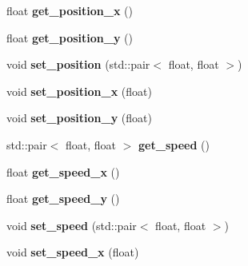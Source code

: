 \begin{DoxyCompactItemize}
\item 
float {\bfseries get\+\_\+position\+\_\+x} ()\hypertarget{classengine_1_1_game_object_a8897eb01abcb75b803977bd112586ca5}{}\label{classengine_1_1_game_object_a8897eb01abcb75b803977bd112586ca5}

\item 
float {\bfseries get\+\_\+position\+\_\+y} ()\hypertarget{classengine_1_1_game_object_aebb20a31340dd04aae07079ddb63528d}{}\label{classengine_1_1_game_object_aebb20a31340dd04aae07079ddb63528d}

\item 
void {\bfseries set\+\_\+position} (std\+::pair$<$ float, float $>$)\hypertarget{classengine_1_1_game_object_ada8fe8ebffd004fc9c37d3ea19b449ba}{}\label{classengine_1_1_game_object_ada8fe8ebffd004fc9c37d3ea19b449ba}

\item 
void {\bfseries set\+\_\+position\+\_\+x} (float)\hypertarget{classengine_1_1_game_object_acdb36a1aa18d98dc0d1d779b869c8e01}{}\label{classengine_1_1_game_object_acdb36a1aa18d98dc0d1d779b869c8e01}

\item 
void {\bfseries set\+\_\+position\+\_\+y} (float)\hypertarget{classengine_1_1_game_object_af11340a490fa5df068c73dbd4b788b9c}{}\label{classengine_1_1_game_object_af11340a490fa5df068c73dbd4b788b9c}

\item 
std\+::pair$<$ float, float $>$ {\bfseries get\+\_\+speed} ()\hypertarget{classengine_1_1_game_object_a62df587f097d4d7890a24687cc7ae2ab}{}\label{classengine_1_1_game_object_a62df587f097d4d7890a24687cc7ae2ab}

\item 
float {\bfseries get\+\_\+speed\+\_\+x} ()\hypertarget{classengine_1_1_game_object_a3efe26ba32b16b65ec2b46e0bc6f8bbc}{}\label{classengine_1_1_game_object_a3efe26ba32b16b65ec2b46e0bc6f8bbc}

\item 
float {\bfseries get\+\_\+speed\+\_\+y} ()\hypertarget{classengine_1_1_game_object_abaacf952522ecc92a47498eca2bac437}{}\label{classengine_1_1_game_object_abaacf952522ecc92a47498eca2bac437}

\item 
void {\bfseries set\+\_\+speed} (std\+::pair$<$ float, float $>$)\hypertarget{classengine_1_1_game_object_a2485b78a86a188c489382180ae8c0f84}{}\label{classengine_1_1_game_object_a2485b78a86a188c489382180ae8c0f84}

\item 
void {\bfseries set\+\_\+speed\+\_\+x} (float)\hypertarget{classengine_1_1_game_object_acec07e80e5a5b83185a2c84d74393bfd}{}\label{classengine_1_1_game_object_acec07e80e5a5b83185a2c84d74393bfd}


\end{DoxyCompactItemize}
